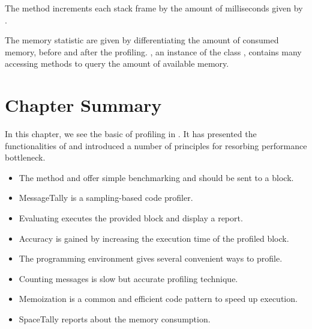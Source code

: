 \documentclass[a4paper,10pt,twoside]{book}
\begin{document}
The method  increments each stack frame by the amount of milliseconds given by .

The memory statistic are given by differentiating the amount of consumed memory, before and after the profiling. , an instance of the class , contains many accessing methods to query the amount of available memory.

\section{Chapter Summary}
In this chapter, we see the basic of profiling in \pharo. It has presented the functionalities of  and introduced a number of principles for resorbing performance bottleneck. 
\begin{itemize}
\item The method  and  offer simple benchmarking and should be sent to a block.

\item MessageTally is a sampling-based code profiler.
\item Evaluating  executes the provided block and display a report.
\item Accuracy is gained by increasing the execution time of the profiled block.
\item The \pharo programming environment gives several convenient ways to profile.
\item Counting messages is slow but accurate profiling technique.
\item Memoization is a common and efficient code pattern to speed up execution.
\item SpaceTally reports about the memory consumption.
\end{itemize}





\ifx\wholebook\relax\else
\end{document}
